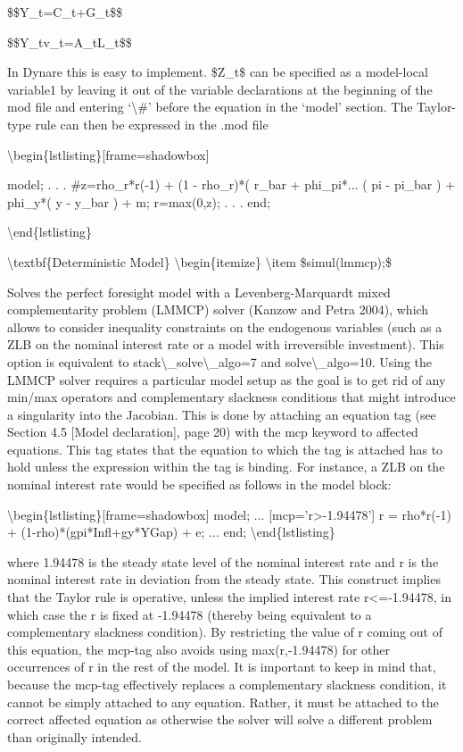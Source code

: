 \documentclass[10pt,math=newtx,citestyle=gb7714-2015,bibstyle=gb7714-2015]{elegantbook}
\begin{document}
	\$\$Y\_t=C\_t+G\_t\$\$
	
	\$\$Y\_tv\_t=A\_tL\_t\$\$
	
	In Dynare this is easy to implement. \$Z\_t\$ can be specified as a model-local variable1 by leaving it out of the variable declarations at the beginning of the mod file and entering ‘\textbackslash{}\#’ before the equation in the ‘model’ section. The Taylor-type rule can then be expressed in the .mod file
	
	\textbackslash{}begin\{lstlisting\}[frame=shadowbox]
	
	model;
	.
	.
	.
	\#z=rho\_r*r(-1) + (1 - rho\_r)*( r\_bar + phi\_pi*...
	( pi - pi\_bar ) + phi\_y*( y - y\_bar ) + m;
	r=max(0,z);
	.
	.
	.
	end;
	
	\textbackslash{}end\{lstlisting\}
	
	\textbackslash{}textbf\{Deterministic Model\}
	\textbackslash{}begin\{itemize\}
	\textbackslash{}item \$simul(lmmcp);\$
	
	Solves the perfect foresight model with a Levenberg-Marquardt mixed complementarity problem (LMMCP) solver (Kanzow and Petra 2004), which allows to consider inequality constraints on the endogenous variables (such as a ZLB on the nominal interest rate or a model with irreversible investment). This option is equivalent to stack\textbackslash{}\_solve\textbackslash{}\_algo=7 and solve\textbackslash{}\_algo=10. Using the LMMCP solver requires a particular model setup as the goal is to get rid of any min/max operators and complementary slackness conditions that might introduce a singularity into the Jacobian. This is done by attaching an equation tag (see Section 4.5 [Model declaration], page 20) with the mcp keyword to affected equations. This tag states that the equation to which the tag is attached has to hold unless the expression within the tag is binding. For instance, a ZLB on the nominal interest rate would be specified as follows in the model block:
	
	\textbackslash{}begin\{lstlisting\}[frame=shadowbox]
	model;
	...
	[mcp='r>-1.94478']
	r = rho*r(-1) + (1-rho)*(gpi*Infl+gy*YGap) + e;
	...
	end;
	\textbackslash{}end\{lstlisting\}
	
	where 1.94478 is the steady state level of the nominal interest rate and r is the nominal interest rate in deviation from the steady state. This construct implies that the Taylor rule is operative, unless the implied interest rate r<=-1.94478, in which case the r is fixed at -1.94478 (thereby being equivalent to a complementary slackness condition). By restricting the value of r coming out of this equation, the mcp-tag also avoids using max(r,-1.94478) for other occurrences of r in the rest of the model. It is important to keep in mind that, because the mcp-tag effectively replaces a complementary slackness condition, it cannot be simply attached to any equation. Rather, it must be attached to the correct affected equation as otherwise the solver will solve a different problem than originally intended.
	
\end{document}
